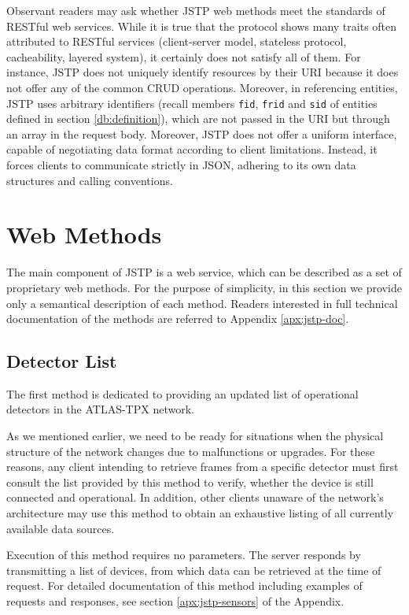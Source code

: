Observant readers may ask whether JSTP web methods meet the standards of RESTful web services. While it is true that the protocol shows many traits often attributed to RESTful services (client-server model, stateless protocol, cacheability, layered system), it certainly does not satisfy all of them. For instance, JSTP does not uniquely identify resources by their URI because it does not offer any of the common CRUD operations. Moreover, in referencing entities, JSTP uses arbitrary identifiers (recall members \texttt{fid}, \texttt{frid} and \texttt{sid} of entities defined in section \ref{db:definition}), which are not passed in the URI but through an array in the request body. Moreover, JSTP does not offer a uniform interface, capable of negotiating data format according to client limitations. Instead, it forces clients to communicate strictly in JSON, adhering to its own data structures and calling conventions.

\section{Web Methods}
\label{jstp:web-methods}
The main component of JSTP is a web service, which can be described as a set of proprietary web methods. For the purpose of simplicity, in this section we provide only a semantical description of each method. Readers interested in full technical documentation of the methods are referred to Appendix \ref{apx:jstp-doc}.

\subsection{Detector List}
The first method is dedicated to providing an updated list of operational detectors in the ATLAS-TPX network.

As we mentioned earlier, we need to be ready for situations when the physical structure of the network changes due to malfunctions or upgrades. For these reasons, any client intending to retrieve frames from a specific detector must first consult the list provided by this method to verify, whether the device is still connected and operational. In addition, other clients unaware of the network's architecture may use this method to obtain an exhaustive listing of all currently available data sources.

Execution of this method requires no parameters. The server responds by transmitting a list of devices, from which data can be retrieved at the time of request. For detailed documentation of this method including examples of requests and responses, see section \ref{apx:jstp-sensors} of the Appendix.

